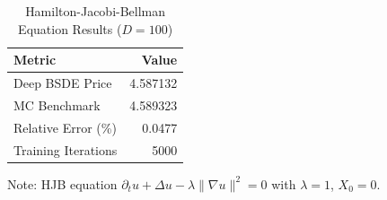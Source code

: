 \begin{table}[htbp]
\centering
\caption{Hamilton-Jacobi-Bellman Equation Results ($D = 100$)}
\label{tab:hjb_results}
\begin{tabular}{@{}lr@{}}
\toprule
\textbf{Metric} & \textbf{Value} \\
\midrule
Deep BSDE Price & 4.587132 \\
MC Benchmark & 4.589323 \\
Relative Error (\%) & 0.0477 \\
Training Iterations & 5000 \\
\bottomrule
\end{tabular}
\begin{tablenotes}
\small
\item Note: HJB equation $\partial_t u + \Delta u - \lambda \|\nabla u\|^2 = 0$ with $\lambda = 1$, $X_0 = 0$.
\end{tablenotes}
\end{table}
